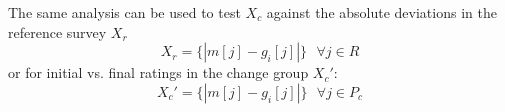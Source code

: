 The same analysis can be used to test $X_c$ against the absolute deviations in the reference survey $X_r$
\begin{equation}
X_r = \{|m[j] - g_i[j]|\}\text{ }\forall j \in R
\end{equation} 
or for initial vs. final ratings in the change group $X_c'$:
\begin{equation}
X_c' = \{|m[j] - g_i[j]|\}\text{ }\forall j \in P_c
\end{equation}




